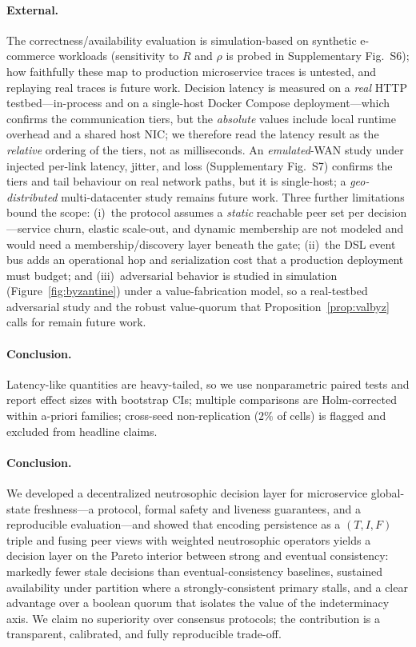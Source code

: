 \documentclass[fleqn,10pt]{wlscirep}
\begin{document}
\paragraph{External.} The correctness/availability evaluation is simulation-based on synthetic
e-commerce workloads (sensitivity to $R$ and $\rho$ is probed in Supplementary Fig.~S6); how
faithfully these map to production microservice traces is untested, and replaying real traces is future
work. Decision latency is measured on a \emph{real} HTTP testbed---in-process and on a single-host Docker
Compose deployment---which confirms the communication tiers, but the \emph{absolute} values include local
runtime overhead and a shared host NIC; we therefore read the latency result as the \emph{relative}
ordering of the tiers, not as milliseconds. An \emph{emulated}-WAN study under injected per-link latency,
jitter, and loss (Supplementary Fig.~S7) confirms the tiers and tail behaviour on real network paths, but
it is single-host; a \emph{geo-distributed} multi-datacenter study remains future work.
Three further limitations bound the scope: (i)~the protocol assumes a \emph{static} reachable peer set
per decision---service churn, elastic scale-out, and dynamic membership are not modeled and would need a
membership/discovery layer beneath the gate; (ii)~the DSL event bus adds an operational hop and
serialization cost that a production deployment must budget; and (iii)~adversarial behavior is studied in
simulation (Figure~\ref{fig:byzantine}) under a value-fabrication model, so a real-testbed adversarial
study and the robust value-quorum that Proposition~\ref{prop:valbyz} calls for remain future work.

\paragraph{Conclusion.} Latency-like quantities are heavy-tailed, so we use nonparametric paired tests
and report effect sizes with bootstrap CIs; multiple comparisons are Holm-corrected within a-priori
families; cross-seed non-replication ($2\%$ of cells) is flagged and excluded from headline claims.

\paragraph{Conclusion.}
\label{sec:conclusion}

We developed a decentralized neutrosophic decision layer for microservice global-state freshness---a
protocol, formal safety and liveness guarantees, and a reproducible evaluation---and showed that
encoding persistence as a $(T,I,F)$ triple and fusing peer views with weighted neutrosophic operators
yields a decision layer on the Pareto interior between strong and eventual consistency: markedly fewer stale decisions than eventual-consistency baselines,
sustained availability under partition where a strongly-consistent primary stalls, and a clear
advantage over a boolean quorum that isolates the value of the indeterminacy axis. We claim no
superiority over consensus protocols; the contribution is a transparent, calibrated, and fully
reproducible trade-off.
\end{document}
